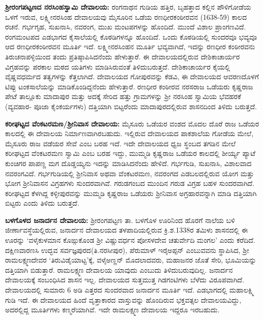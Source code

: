 \textbf{ಶ‍್ರೀರಂಗಪಟ್ಟಣದ ನರಸಿಂಹಸ್ವಾಮಿ ದೇವಾಲಯ:} ರಂಗನಾಥನ ಗುಡಿಯ ಹತ್ತಿರ, ಬೃಹತ್ತಾದ ಕಲ್ಲಿನ ಪೌಳಿಗೋಡೆಯ ಒಳಗೆ ಇರುವ, ಲಕ್ಷ್ಮೀನರಸಿಂಹ ದೇವಾಲಯವು ಮೈಸೂರಿನ ಒಡೆಯ ರಣಧೀರಕಂಠೀರವನ (1638-59) ಕಾಲದ ರಚನೆ. ಗರ್ಭಗೃಹ, ಸುಖನಾಸಿ, ನವರಂಗ, ಮುಖ ಮಂಟಪಗಳನ್ನು ಹೊಂದಿದೆ. ಮುಂದೆ ವಿಶಾಲ ಪ್ರಾಂಗಣವಿದೆ. ರಂಗಮಂಟಪದ ಎಡಭಾಗದ ಕೈಸಾಲೆಯಲ್ಲಿ ಕೊಠಡಿಗಳನ್ನೂ ಹೊಂದಿದೆ. ಒಂದು ಕೊಠಡಿಯಲ್ಲಿ ಸುಂದರವೂ ಭವ್ಯವೂ ಆದ ರಣಧೀರಕಂಠೀರವನ ಮೂರ್ತಿ ಇದೆ. ಲಕ್ಷ್ಮೀನರಸಿಂಹನ ಮೂರ್ತಿ ಭವ್ಯವಾಗಿದೆ, ಇದನ್ನು ರಣಧೀರ ಕಂಠೀರವನು ತಿರುಚನಾಪಳ್ಳಿಯಿಂದ ತಂದು ಪ್ರತಿಷ್ಠಾಪಿಸಿದನೆಂದು ಹೇಳುತ್ತಾರೆ. ಈ ದೇವಾಲಯದಲ್ಲಿರುವ ದೇಶಿಕಾಚಾರ್ಯರ ವಿಗ್ರಹವನ್ನು ಪರಕಾಲ ಮಠದ ಯತಿಗಳು ಮಾಡಿಸಿರುವಂತೆ ತಿಳಿದುಬರುತ್ತದೆ. ದೇಶಿಕಾಚಾರ್ಯರ ಕೈಯಲ್ಲಿ ವೈಷ್ಣವಧರ್ಮದ ತತ್ವಗಳನ್ನು ಕೆತ್ತಲಾಗಿದೆ. ದೇವಾಲಯದ ಗೋಪುರವನ್ನು ಕೆಡವಿ, ಈ ದೇವಾಲಯದ ಆವರಣದೊಳಗೆ ಟಿಪ್ಪು ಟಂಕಸಾಲೆಯನ್ನು ಮಾಡಿಕೊಂಡಿದ್ದನೆಂದು ಹೇಳುತ್ತಾರೆ. ರಣಧೀರ ಕಂಠೀರವ ನರಸರಾಜ ಒಡೆಯರು ಕೃಷ್ಣರಾಜ ಪೇಟೆ ತಾಲ್ಲೂಕು ಮಾದಾಪುರ ಮತ್ತು ಅದಕ್ಕೆ ಸೇರಿದ ಹತ್ತು ಗ್ರಾಮಗಳನ್ನು ಶ‍್ರೀ ನರಸಿಂಹ ಸ್ವಾಮಿಯ ಭೆವಹರಕೆ (ವ್ಯವಹಾರ- ಪೂಜಾ ಕೈಂಕರ್ಯಗಳು) ದತ್ತಿಯಾಗಿ ಬಿಟ್ಟರೆಂದು ಮಾದಾಪುರದಲ್ಲಿರುವ ಶಾಸನದಿಂದ ತಿಳಿದು ಬರುತ್ತದೆ.

\textbf{ಕರೀಘಟ್ಟದ ವೆಂಕಟರಮಣ/ಶ‍್ರೀನಿವಾಸ ದೇವಾಲಯ:} ಮೈಸೂರು ಒಡೆಯರ ವಂಶದ ಮೊದಲ ದೊರೆ ರಾಜ ಒಡೆಯರ ಕಾಲದಲ್ಲಿ ಈ ದೇವಾಲಯ ನಿರ್ಮಾಣವಾಗಿರಬಹುದು. ಇಲ್ಲಿರುವ ದೇವಾಲಯದ ಪಾಕಶಾಲೆಯ ಗೋಡೆಯ ಮೇಲೆ, ಮೈಸೂರು ರಾಜ ವಡೆಯರ ಸೇವೆ ಎಂಬ ಬರಹ ಇದೆ. ಇದೇ ದೇವಾಲಯದ ಧ್ವಜ ಸ್ಥಂಬದ ತಗಡಿನ ಮೇಲೆ ಕರೀಘಟ್ಟದ ವೆಂಕಟರಮಣ ಸ್ವಾಮಿ ಎಂಬ ಬರಹ ಇದ್ದು, ಮುಮ್ಮಡಿ ಕೃಷ್ಣರಾಜ ಒಡೆಯರ ಕಾಲದಲ್ಲಿ ಶೀರ್ಯ್ಯ ಪ್ಯಾಟೆ ಕುಂಚಿಗರ ಪಾಪಣ್ಣ ಮಗ ದೊಡ್ಡಯ್ಯನು ಇದನ್ನು ಮಾಡಿಸಿದನೆಂದು ಹೇಳಿದೆ. ಗರ್ಭಗುಡಿ, ಸುಖನಾಸಿ, ವಿಶಾಲವಾದ ನವರಂಗವಿದೆ. ಗರ್ಭಗುಡಿಯಲ್ಲಿ ಶ‍್ರೀನಿವಾಸ ಅಥವಾ ವೆಂಕಟರಮಣ, ನವರಂಗದ ಎಡಬಲದಲ್ಲಿರುವ ಯೋಗ ಮತ್ತು ಭೋಗ ಶ‍್ರೀನಿವಾಸನ ವಿಗ್ರಹಗಳು ಸುಂದರವಾಗಿವೆ. ಗರುಡಗಂಬದ ಮುಂದಿನ ಗರುಡ ವಿಗ್ರಹ ಬಹಳ ಸುಂದರವಾಗಿದೆ. ಕರೀಘಟ್ಟದ ಕೆಳಗಿದ್ದ ಕಳ್ಳೀಪುರವನ್ನು ಮುಮ್ಮಡಿ ಕೃಷ್ಣರಾಜ ಒಡೆಯರು ಶ‍್ರೀನಿವಾಸ ಅಗ್ರಹಾರವನ್ನಾಗಿ ಮಾಡಿ ದತ್ತಿಯಾಗಿ ಬಿಟ್ಟರು ಎಂದು ತಿಳಿದು ಬರುತ್ತದೆ.

\textbf{ಬಳಗೊಳದ ಜನಾರ್ದನ ದೇವಾಲಯ:} ಶ‍್ರೀರಂಗಪಟ್ಟಣ ತಾ. ಬಳಗೊಳ ಊರಿನಿಂದ ಹೊರಗೆ ನಾಲೆಯ ಬಳಿ ಜೀರ್ಣಾವಸ್ಥೆಯಲ್ಲಿರುವ, ಜನಾರ್ದನ ದೇವಾಲಯದ ತಳಪಾದಿಯಲ್ಲಿರುವ ಕ್ರಿ.ಶ.1338ರ ತಮಿಳು ಶಾಸನದಲ್ಲಿ ಈ ಊರನ್ನು ‘ವಳೈಕುಳಮಾನ ಕೊಙ್ಗುಕೊಂಡ ಶ‍್ರೀ ವಿಷ್ಣುವರ್ಧನ ಪೋಸಳದೇವ ಚತುರ್ವೇದಿ ಮಂಗಲ’ ಎಂದು ಕರೆದಿದೆ. ದಕ್ಷಿಣವಾರಣಸಿ ಉದ್ಭವ ಸರ್ವಜ್ಞಪುರದ(ತಿ.ನರಸೀಪುರ), ಪೆರುಮಾಳ್​ ಇರೈಅಪ್ಪನ್​ ಎಂಬುವವನು ಸ್ಥಾಪಿಸಿದ, ಶ‍್ರೀ ರಾಮಲಕ್ಷ್ಮಣದೇವರ ‘ತಿರುವಿಡೈಯಾಟ್ಟ’ಕ್ಕೆ, ವಳೈಅಣ್ಣನ್​ ಮೊದಲಾದವರು, ಮಹಾಜನರ ಜೊತೆ ಸೇರಿ, ಭೂಮಿಯನ್ನು ದತ್ತಿಯಾಗಿ ಬಿಡುತ್ತಾರೆ. ರಾಮಲಕ್ಷ್ಮಣ ದೇವಾಲಯ ಯಾವುದು ಎಂಬುದು ತಿಳಿದುಬರುವುದಿಲ್ಲ. ಜನಾರ್ದನ ದೇವಾಲಯಕ್ಕೆ ಸಂಬಂಧಿಸಿದ ಶಾಸನ ಇಲ್ಲ. ದೇವಾಲಯದ ಸುತ್ತಮುತ್ತ ಗಿಡಗಂಟಿಗಳು ಬೆಳೆದು ವಿರೂಪವಾಗಿದೆ. ದೇವಾಲಯದಲ್ಲಿ ಸುಮಾರು 6 ಅಡಿ ಎತ್ತರದ ಸುಂದರವಾದ ಜನಾರ್ದನ ಮೂರ್ತಿ ಇದೆ. ಎಡಭಾಗದಲ್ಲಿ ಮಹಾಲಕ್ಷ್ಮಿ ಗುಡಿ ಇದೆ. ಈ ದೇವಾಲಯದ ಹಿಂದೆ ವೃತ್ತಾಕಾರದ ವಾಸ್ತುವನ್ನು ಹೊಂದಿರುವ ಭಕ್ತವತ್ಸಲ ದೇವಾಲಯವಿದ್ದು, ಅದರಲ್ಲಿದ್ದ ಮೂರ್ತಿಗಳು ಕಣ್ಮರೆಯಾಗಿವೆ. ಇದೇ ರಾಮಲಕ್ಷ್ಮಣ ದೇವಾಲಯ ಇದ್ದರೂ ಇರಬಹುದು.

